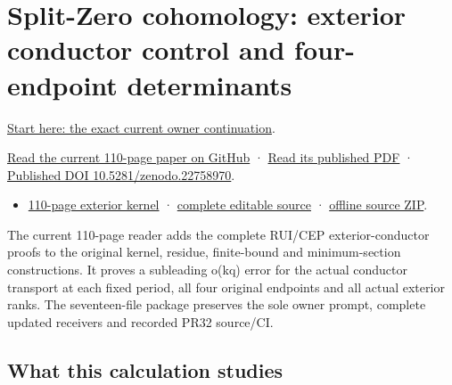 \documentclass[
]{article}
\providecommand{\tightlist}{%
  \setlength{\itemsep}{0pt}\setlength{\parskip}{0pt}}
\begin{document}
\section{Split-Zero cohomology: exterior conductor control and
four-endpoint
determinants}\label{split-zero-cohomology-exterior-conductor-control-and-four-endpoint-determinants}

\href{https://github.com/KokunoYumeto/zeta-function-research-reader/blob/dad07e28faa735104ddc0b137521620fc315e6fc/workbenches/splitzero-tandem/continuations/20260914-exterior-kernel-continuation/00_CONTINUE_HERE.md}{Start
here: the exact current owner continuation}.

\href{https://github.com/KokunoYumeto/zeta-function-research-reader/blob/dad07e28faa735104ddc0b137521620fc315e6fc/workbenches/splitzero-tandem/continuations/20260914-exterior-kernel-continuation/15_CURRENT_MIXED_CONTROL_READER.pdf}{Read
the current 110-page paper on GitHub} ·
\href{https://zenodo.org/api/records/22758970/files/57-exterior-kernel-reader.pdf/content}{Read
its published PDF} ·
\href{https://doi.org/10.5281/zenodo.22758970}{Published DOI
10.5281/zenodo.22758970}.

\begin{itemize}
\tightlist
\item
  \href{https://zenodo.org/api/records/22758970/files/57-exterior-kernel-reader.pdf/content}{110-page
  exterior kernel} ·
  \href{https://github.com/KokunoYumeto/zeta-function-research-reader/tree/dad07e28faa735104ddc0b137521620fc315e6fc/workbenches/splitzero-tandem/continuations/20260914-exterior-kernel-continuation}{complete
  editable source} ·
  \href{https://zenodo.org/api/records/22758970/files/58-exterior-kernel-sources.zip/content}{offline
  source ZIP}.
\end{itemize}

The current 110-page reader adds the complete RUI/CEP exterior-conductor
proofs to the original kernel, residue, finite-bound and minimum-section
constructions. It proves a subleading o(kq) error for the actual
conductor transport at each fixed period, all four original endpoints
and all actual exterior ranks. The seventeen-file package preserves the
sole owner prompt, complete updated receivers and recorded PR32
source/CI.

\subsection{What this calculation
studies}\label{what-this-calculation-studies-1}
\end{document}
